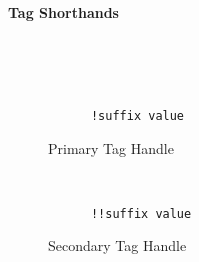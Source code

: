 \paragraph{Tag Shorthands}~\\

\begin{figure}[H]
  \begin{minipage}[t]{0.48\textwidth}
    \vspace{0pt}
    \begin{bchart}[max=9, width=0.85\textwidth]
      \bcxlabel{}
    \end{bchart}
  \end{minipage}
  \begin{minipage}[t]{0pt}~\end{minipage}
  \begin{minipage}[t]{0.48\textwidth}
    \vspace{0pt}
    \begin{verbatim}
      !suffix value
    \end{verbatim}
  \end{minipage}
  \caption{Primary Tag Handle}
\end{figure}

\begin{figure}[H]
  \begin{minipage}[t]{0.48\textwidth}
    \vspace{0pt}
    \begin{bchart}[max=9, width=0.85\textwidth]
    \end{bchart}
  \end{minipage}
  \begin{minipage}[t]{0pt}~\end{minipage}
  \begin{minipage}[t]{0.48\textwidth}
    \vspace{0pt}
    \begin{verbatim}
      !!suffix value
    \end{verbatim}
  \end{minipage}
  \caption{Secondary Tag Handle}
\end{figure}

